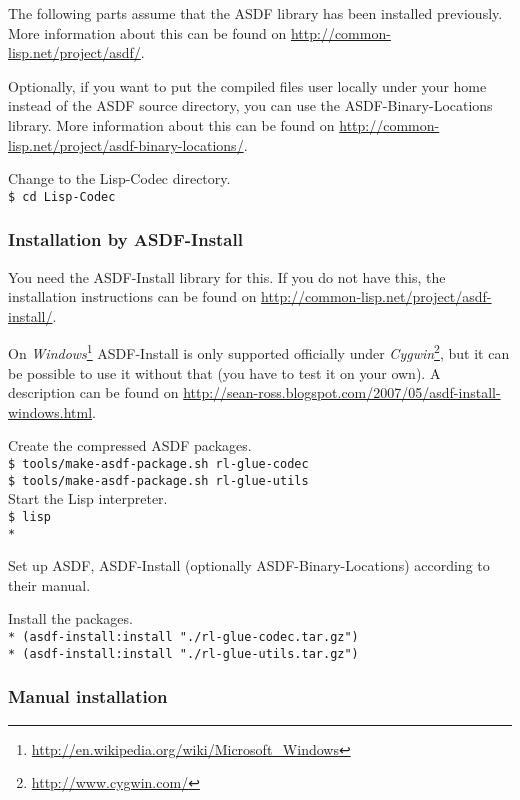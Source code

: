 \documentclass[11pt,a4paper,dvipdfm]{article}
\newcommand{\selfref}[1]{\href{#1}{#1}}
\newcommand{\footref}[2]{\textsl{#1}\footnote{\selfref{#2}}}
\newcommand{\prompttext}[1]{\texttt{#1}}
\newcommand{\shprompt}[1]{\prompttext{\$ #1}}
\newcommand{\lispprompt}[1]{\prompttext{* #1}}
\begin{document}
The following parts assume that the ASDF library has been installed
previously. More information about this can be found on
\selfref{http://common-lisp.net/project/asdf/}.

Optionally, if you want to put the compiled files user locally under your
home instead of the ASDF source directory, you can use the
ASDF-Binary-Locations library. More information about this can be found on
\selfref{http://common-lisp.net/project/asdf-binary-locations/}.

Change to the Lisp-Codec directory. \\
\shprompt{cd Lisp-Codec}

\hypertarget{asdfinst}{\subsubsection{Installation by ASDF-Install}}

You need the ASDF-Install library for this. If you do not have this, the
installation instructions can be found on
\selfref{http://common-lisp.net/project/asdf-install/}.

On \footref{Windows}{http://en.wikipedia.org/wiki/Microsoft\_Windows}
ASDF-Install is only supported officially under
\footref{Cygwin}{http://www.cygwin.com/}, but it can be possible to use it
without that (you have to test it on your own). A description can be found on
\selfref{http://sean-ross.blogspot.com/2007/05/asdf-install-windows.html}.

Create the compressed ASDF packages. \\
\shprompt{tools/make-asdf-package.sh rl-glue-codec} \\
\shprompt{tools/make-asdf-package.sh rl-glue-utils} \\

Start the Lisp interpreter. \\
\shprompt{lisp} \\
\lispprompt{}

Set up ASDF, ASDF-Install (optionally ASDF-Binary-Locations) according to
their manual.

Install the packages. \\
\lispprompt{(asdf-install:install "./rl-glue-codec.tar.gz")} \\
\lispprompt{(asdf-install:install "./rl-glue-utils.tar.gz")}

\subsubsection{Manual installation}
\end{document}
